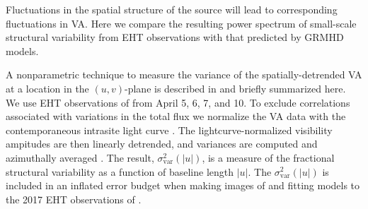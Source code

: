 Fluctuations in the spatial structure of the source will lead to corresponding fluctuations in VA.  Here we compare  the resulting power spectrum of small-scale structural variability from EHT observations with that predicted by GRMHD models.


A nonparametric technique to measure the variance of the spatially-detrended VA at a location in the $(u,v)$-plane is described in \citet{NoiseModeling} and briefly summarized here.  We use EHT observations of \sgra from April 5, 6, 7, and 10.  To exclude correlations associated with  variations in the total flux we normalize the VA data with the contemporaneous intrasite light curve \citep{Georgiev_2022}.  The lightcurve-normalized visibility ampitudes are then linearly detrended, and variances are computed and azimuthally averaged \citep{NoiseModeling}.  The result, $\sigma_\text{var}^2 (|u|)$, is a measure of the fractional structural variability as a function of baseline length $|u|$.  The $\sigma_\text{var}^2 (|u|)$ is included in an inflated error budget when making images of and fitting models to the 2017 EHT observations of \sgra {}.

